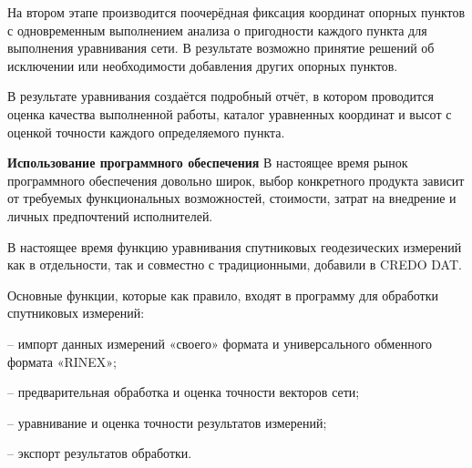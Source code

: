 \documentclass[a4paper]{article}
\begin{document}
\begin{newpage}
{        \par На втором этапе производится поочерёдная фиксация координат опорных пунктов с одновременным выполнением анализа о пригодности каждого пункта для выполнения уравнивания сети. В результате возможно принятие решений об исключении или необходимости добавления других опорных пунктов.
        \par В результате уравнивания создаётся подробный отчёт, в котором проводится оценка качества выполненной работы, каталог уравненных координат и высот с оценкой точности каждого определяемого пункта.\\
        \par\textbf{Использование программного обеспечения} В настоящее время рынок программного обеспечения довольно широк, выбор конкретного продукта зависит от требуемых функциональных возможностей, стоимости, затрат на внедрение и личных предпочтений исполнителей.
        \par В настоящее время функцию уравнивания спутниковых геодезических измерений как в отдельности, так и совместно с традиционными, добавили в CREDO DAT.
        \par Основные функции, которые как правило, входят в программу для обработки спутниковых измерений:
        \par – импорт данных измерений «своего» формата и универсального обменного формата «RINEX»;
        \par – предварительная обработка и оценка точности векторов сети;
        \par – уравнивание и оценка точности результатов измерений;
        \par – экспорт результатов обработки.
    }

\end{newpage}
\end{document}
